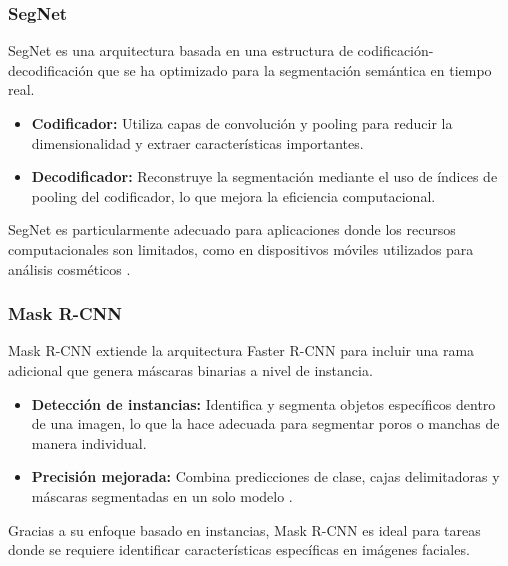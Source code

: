 \subsubsection{SegNet}  
SegNet es una arquitectura basada en una estructura de codificación-decodificación que se ha optimizado para la segmentación semántica en tiempo real.  
\begin{itemize}
    \item \textbf{Codificador:} Utiliza capas de convolución y pooling para reducir la dimensionalidad y extraer características importantes.
    \item \textbf{Decodificador:} Reconstruye la segmentación mediante el uso de índices de pooling del codificador, lo que mejora la eficiencia computacional.
\end{itemize}  
SegNet es particularmente adecuado para aplicaciones donde los recursos computacionales son limitados, como en dispositivos móviles utilizados para análisis cosméticos \cite{autor2021segnet}.

\subsubsection{Mask R-CNN}  
Mask R-CNN extiende la arquitectura Faster R-CNN para incluir una rama adicional que genera máscaras binarias a nivel de instancia.  
\begin{itemize}
    \item \textbf{Detección de instancias:} Identifica y segmenta objetos específicos dentro de una imagen, lo que la hace adecuada para segmentar poros o manchas de manera individual.
    \item \textbf{Precisión mejorada:} Combina predicciones de clase, cajas delimitadoras y máscaras segmentadas en un solo modelo \cite{autor2022maskrcnn}.
\end{itemize}  
Gracias a su enfoque basado en instancias, Mask R-CNN es ideal para tareas donde se requiere identificar características específicas en imágenes faciales.

